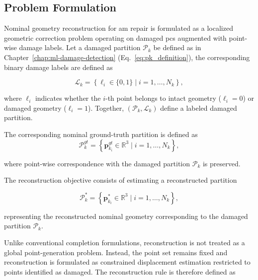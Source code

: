 \subsection{Problem Formulation}
\label{sec:problem_formulation}

Nominal geometry reconstruction for \ac{am} repair is formulated as a localized geometric correction problem operating on damaged \acp{pc} augmented with point-wise damage labels. Let a damaged partition $\mathcal{P}_{k}$ be defined as in Chapter~\ref{chap:ml-damage-detection} (Eq.~\ref{eq:pk_definition}), the corresponding binary damage labels are defined as

\begin{equation}
\mathcal{L}_k =
\left\{
\ell_i \in \{0,1\}
\mid
i = 1,\dots,N_k
\right\},
\label{eq:label}
\end{equation}

\noindent where $\ell_i$ indicates whether the $i$-th point belongs to intact geometry ($\ell_i = 0$) or damaged geometry ($\ell_i = 1$). Together, $(\mathcal{P}_k,\mathcal{L}_k)$ define a labeled damaged partition.


The corresponding nominal ground-truth partition is defined as
\begin{equation}
\mathcal{P}_{k}^{gt}
=
\left\{
\mathbf{p}_{k_i}^{gt} \in \mathbb{R}^{3}
\mid
i = 1,\dots,N_k
\right\},
\end{equation}

\noindent where point-wise correspondence with the damaged partition $\mathcal{P}_{k}$ is preserved.

The reconstruction objective consists of estimating a reconstructed partition

\begin{equation}
\mathcal{P}_{k}^{*}
=
\left\{
\mathbf{p}_{k_i}^{*} \in \mathbb{R}^{3}
\mid
i = 1,\dots,N_k
\right\},
\label{eq:output_pc}
\end{equation}

\noindent representing the reconstructed nominal geometry corresponding to the damaged partition $\mathcal{P}_k$.

Unlike conventional completion formulations, reconstruction is not treated as a global point-generation problem. Instead, the point set remains fixed and reconstruction is formulated as constrained displacement estimation restricted to points identified as damaged. The reconstruction rule is therefore defined as

